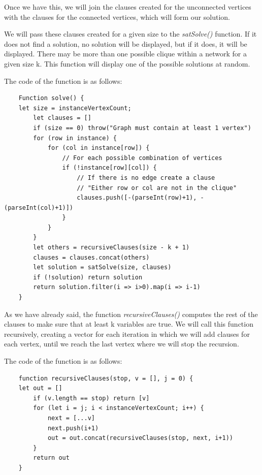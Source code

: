 \documentclass[table]{article}
\begin{document}
Once we have this, we will join the clauses created for the unconnected vertices with the clauses for the connected vertices, which will form our solution.

We will pass these clauses created for a given size to the \textit{satSolve()} function. If it does not find a solution, no solution will be displayed, but if it does, it will be displayed. There may be more than one possible clique within a network for a given size k. This function will display one of the possible solutions at random.\newline

The code of the function is as follows:

\begin{lstlisting}
    Function solve() {
	let size = instanceVertexCount;
    	let clauses = []
        if (size == 0) throw("Graph must contain at least 1 vertex")
        for (row in instance) {
            for (col in instance[row]) {
                // For each possible combination of vertices
                if (!instance[row][col]) {
                    // If there is no edge create a clause
                    // "Either row or col are not in the clique"
                    clauses.push([-(parseInt(row)+1), -(parseInt(col)+1)])
                }
            }
        }
        let others = recursiveClauses(size - k + 1)
        clauses = clauses.concat(others)
        let solution = satSolve(size, clauses)
        if (!solution) return solution 
        return solution.filter(i => i>0).map(i => i-1)
    }

\end{lstlisting}

As we have already said, the function \textit{recursiveClauses()} computes the rest of the clauses to make sure that at least k variables are true. 
We will call this function recursively, creating a vector for each iteration in which we will add clauses for each vertex, until we reach the last vertex where we will stop the recursion.

The code of the function is as follows:

\begin{lstlisting}
    function recursiveClauses(stop, v = [], j = 0) {
    let out = []
        if (v.length == stop) return [v]
        for (let i = j; i < instanceVertexCount; i++) {
            next = [...v]
            next.push(i+1)
            out = out.concat(recursiveClauses(stop, next, i+1))
        }
        return out
    }

\end{lstlisting}
\end{document}
